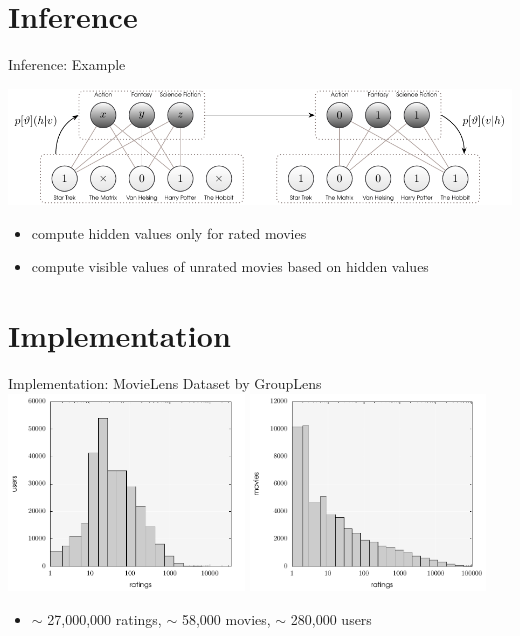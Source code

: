 \documentclass[aspectratio=169]{beamer}
\begin{document}
  \section{Inference} %
  \label{sec:inference}
    \begin{frame}{Inference: Example}
      \begin{center}
        \includegraphics[width=\textwidth]{figures/rbm-inference-example.pdf}
      \end{center}
      \vfill
      \begin{itemize}
        \pause
        \item compute hidden values only for rated movies
        \pause
        \item compute visible values of unrated movies based on hidden values
      \end{itemize}
    \end{frame}

  \section{Implementation} %
  \label{sec:implementation}
    \begin{frame}{Implementation: MovieLens Dataset by GroupLens}
      \includegraphics[width=0.47\textwidth]{figures/movielens-user-histogram.pdf}
      \hfill
      \includegraphics[width=0.47\textwidth]{figures/movielens-movie-histogram.pdf}
      \vfill
      \begin{itemize}
        \item $\sim$ 27,000,000 ratings, $\sim$ 58,000 movies, $\sim$ 280,000 users
      \end{itemize}
    \end{frame}
\end{document}
